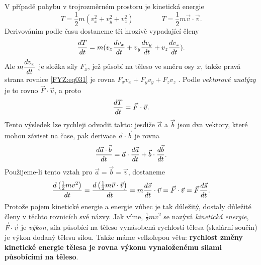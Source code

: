 {    V případě pohybu v trojrozměrném prostoru je kinetická energie
    \begin{equation}\label{FYZ:eq030}
      T = \frac{1}{2}m(v_x^2 + v_y^2 + v_z^2) \qquad\qquad 
      T = \frac{1}{2}m\vec{v}\cdot\vec{v}.
    \end{equation}
    Derivováním podle času dostaneme tři hrozivě vypadající členy
    \begin{equation}\label{FYZ:eq031}
      \dfrac{d T}{d t} = m(v_x\dfrac{d v_x}{d t} + v_y\dfrac{d v_y}{d t} + v_z\dfrac{d v_z}{d t}).
    \end{equation}
    Ale \(m\dfrac{d v_x}{d t}\) je složka síly \(F_x\), jež působí na těleso ve směru osy \(x\), takže 
    pravá strana rovnice \ref{FYZ:eq031} je rovna \(F_xv_x + F_yv_y + F_zv_z\) . Podle 
    \emph{vektorové analýzy} je to rovno \(\vec{F}\cdot\vec{v}\), a proto
    \begin{equation}\label{FYZ:eq032}
      \dfrac{d T}{d t} = \vec{F}\cdot\vec{v}.
    \end{equation}
    Tento výsledek lze rychleji odvodit takto: jesdiže \(\vec{a}\) a \(\vec{b}\) jsou dva vektory, 
    které mohou záviset na čase, pak derivace \(\vec{a}\cdot\vec{b}\) je rovna
    \begin{equation}\label{FYZ:eq033}
      \dfrac{d \vec{a}\cdot\vec{b}}{d t} = \vec{a}\cdot\dfrac{d \vec{a}}{d t} + \vec{b}\cdot\dfrac{d \vec{b}}{d t}.
    \end{equation}
    Použijeme-li tento vztah pro \(\vec{a}=\vec{b}=\vec{v}\), dostaneme
    \begin{equation}\label{FYZ:eq034}
      \dfrac{d \left(\frac{1}{2}mv^2\right)}{d t} = 
      \dfrac{d \left(\frac{1}{2}m\vec{v}\cdot\vec{v}\right)}{d t} = 
      m\dfrac{d \vec{v}}{d t}\cdot\vec{v} = 
      \vec{F}\cdot\vec{v} = 
      \vec{F}\dfrac{d \vec{s}}{d t}.
    \end{equation}
    Protože pojem kinetické energie a energie vůbec je tak důležitý, dostaly důležité členy v 
    těchto rovnicích své názvy. Jak víme, \(\frac{1}{2}mv^2\) se nazývá \emph{kinetická energie}, 
    \(\vec{F}\cdot\vec{v}\) je \emph{výkon}, síla působící na těleso vynásobená rychlostí tělesa 
    (skalární součin) je výkon dodaný tělesu silou. Takže máme velkolepou větu: \textbf{rychlost 
    změny kinetické energie tělesa je rovna výkonu vynaloženému silami působícími na těleso}.
    
}
